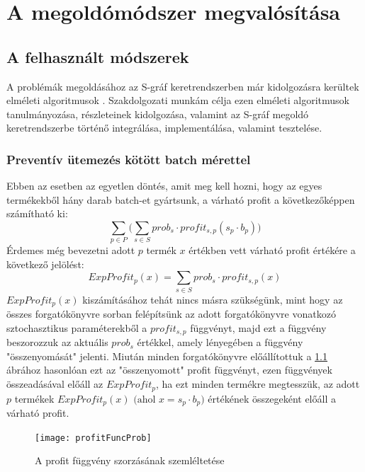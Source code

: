 \chapter{A megoldómódszer megvalósítása}  \label{Problem_impl}
\section{A felhasznált módszerek} \label{math_modells}
A problémák megoldásához az S-gráf keretrendszerben már kidolgozásra kerültek elméleti algoritmusok \cite{phd_Hegyhati}.
Szakdolgozati munkám célja ezen elméleti algoritmusok tanulmányozása, részleteinek kidolgozása, valamint az S-gráf megoldó keretrendszerbe történő integrálása, implementálása, valamint tesztelése.
\subsection{Preventív ütemezés kötött batch mérettel} \label{FixBatchSize}
Ebben az esetben az egyetlen döntés, amit meg kell hozni, hogy az egyes termékekből hány darab batch-et gyártsunk, a várható profit a következőképpen számítható ki:
$$\sum_{p \in P}\bigg (\sum_{s \in S} prob_s \cdot profit_{s,p} (s_p \cdot b_p)\bigg)$$
Érdemes még bevezetni adott $p$ termék $x$ értékben vett várható profit értékére a következő jelölést:
$$ExpProfit_p(x)=\sum_{s \in S}prob_s \cdot profit_{s,p}(x)$$
$ExpProfit_p(x)$ kiszámításához tehát nincs másra szükségünk, mint hogy az összes forgatókönyvre sorban felépítsünk az adott forgatókönyvre vonatkozó sztochasztikus paraméterekből a $profit_{s,p}$ függvényt, majd ezt a függvény beszorozzuk az aktuális $prob_s$ értékkel, amely lényegében a függvény "összenyomását" jelenti. 
Miután minden forgatókönyvre előállítottuk a \ref{profit_func_prob} ábrához hasonlóan ezt az "összenyomott" profit függvényt, ezen függvények összeadásával előáll az $ExpProfit_p$, ha ezt minden termékre megtesszük, az adott $p$ termékek $ExpProfit_p(x) \text{ (ahol }x=s_p \cdot b_p)$ értékének összegeként előáll a várható profit.
\begin{figure}[H]
\begin{center}
\texttt{[image: profitFuncProb]}
\caption{A profit függvény szorzásának szemléltetése}
\label{profit_func_prob}
\end{center}
\end{figure}
